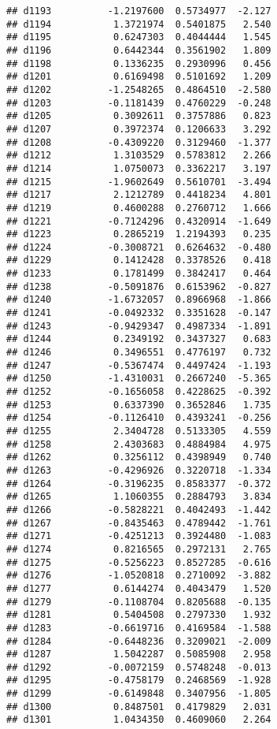 \documentclass[
]{article}
\begin{document}
\begin{verbatim}
## d1193          -1.2197600  0.5734977  -2.127
## d1194           1.3721974  0.5401875   2.540
## d1195           0.6247303  0.4044444   1.545
## d1196           0.6442344  0.3561902   1.809
## d1198           0.1336235  0.2930996   0.456
## d1201           0.6169498  0.5101692   1.209
## d1202          -1.2548265  0.4864510  -2.580
## d1203          -0.1181439  0.4760229  -0.248
## d1205           0.3092611  0.3757886   0.823
## d1207           0.3972374  0.1206633   3.292
## d1208          -0.4309220  0.3129460  -1.377
## d1212           1.3103529  0.5783812   2.266
## d1214           1.0750073  0.3362217   3.197
## d1215          -1.9602649  0.5610701  -3.494
## d1217           2.1212789  0.4418234   4.801
## d1219           0.4600288  0.2760712   1.666
## d1221          -0.7124296  0.4320914  -1.649
## d1223           0.2865219  1.2194393   0.235
## d1224          -0.3008721  0.6264632  -0.480
## d1229           0.1412428  0.3378526   0.418
## d1233           0.1781499  0.3842417   0.464
## d1238          -0.5091876  0.6153962  -0.827
## d1240          -1.6732057  0.8966968  -1.866
## d1241          -0.0492332  0.3351628  -0.147
## d1243          -0.9429347  0.4987334  -1.891
## d1244           0.2349192  0.3437327   0.683
## d1246           0.3496551  0.4776197   0.732
## d1247          -0.5367474  0.4497424  -1.193
## d1250          -1.4310031  0.2667240  -5.365
## d1252          -0.1656058  0.4228625  -0.392
## d1253           0.6337390  0.3652846   1.735
## d1254          -0.1126410  0.4393241  -0.256
## d1255           2.3404728  0.5133305   4.559
## d1258           2.4303683  0.4884984   4.975
## d1262           0.3256112  0.4398949   0.740
## d1263          -0.4296926  0.3220718  -1.334
## d1264          -0.3196235  0.8583377  -0.372
## d1265           1.1060355  0.2884793   3.834
## d1266          -0.5828221  0.4042493  -1.442
## d1267          -0.8435463  0.4789442  -1.761
## d1271          -0.4251213  0.3924480  -1.083
## d1274           0.8216565  0.2972131   2.765
## d1275          -0.5256223  0.8527285  -0.616
## d1276          -1.0520818  0.2710092  -3.882
## d1277           0.6144274  0.4043479   1.520
## d1279          -0.1108704  0.8205688  -0.135
## d1281           0.5404508  0.2797330   1.932
## d1283          -0.6619716  0.4169584  -1.588
## d1284          -0.6448236  0.3209021  -2.009
## d1287           1.5042287  0.5085908   2.958
## d1292          -0.0072159  0.5748248  -0.013
## d1295          -0.4758179  0.2468569  -1.928
## d1299          -0.6149848  0.3407956  -1.805
## d1300           0.8487501  0.4179829   2.031
## d1301           1.0434350  0.4609060   2.264

\end{verbatim}
\end{document}

